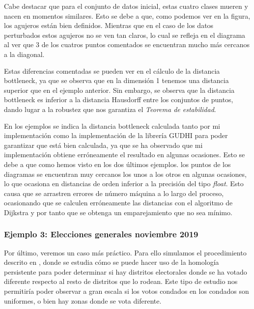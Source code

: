 Cabe destacar que para el conjunto de datos inicial, estas cuatro clases mueren y nacen en momentos similares. Esto se debe a que, como podemos ver en la figura, los agujeros están bien definidos. Mientras que en el caso de los datos perturbados estos agujeros no se ven tan claros, lo cual se refleja en el diagrama al ver que 3 de los cuatros puntos comentados se encuentran mucho más cercanos a la diagonal.

Estas diferencias comentadas se pueden ver en el cálculo de la distancia bottleneck, ya que se observa que en la dimensión 1 tenemos una distancia superior que en el ejemplo anterior. Sin embargo, se observa que la distancia bottleneck es inferior a la distancia Hausdorff entre los conjuntos de puntos, dando lugar a la robustez que nos garantiza el \emph{Teorema de estabilidad}.


\begin{remark}
En los ejemplos se indica la distancia bottleneck calculada tanto por mi implementación como la implementación de la librería GUDHI \cite{gudhi:BottleneckDistance} para poder garantizar que está bien calculada, ya que se ha observado que mi implementación obtiene erróneamente el resultado en algunas ocasiones. Esto se debe a que como hemos visto en los dos últimos ejemplos. los puntos de los diagramas se encuentran muy cercanos los unos a los otros en algunas ocasiones, lo que ocasiona en distancias de orden inferior a la precisión del tipo \textit{float}. Esto causa que se arrastren errores de número máquina a lo largo del proceso, ocasionando que se calculen erróneamente las distancias con el algoritmo de Dijkstra y por tanto que se obtenga un emparejamiento que no sea mínimo. 
\end{remark}

\subsubsection{Ejemplo 3: Elecciones generales noviembre 2019}
Por último, veremos un caso más práctico. Para ello simulamos el procedimiento descrito en \cite{votosArticulo}, donde se estudia cómo se puede hacer uso de la homología persistente para poder determinar si hay distritos electorales donde se ha votado diferente respecto al resto de distritos que lo rodean. Este tipo de estudio nos permitiría poder observar a gran escala si los votos condados en los condados son uniformes, o bien hay zonas donde se vota diferente.

